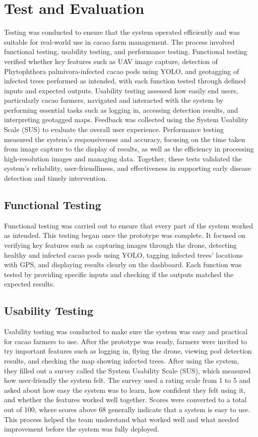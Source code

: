 \section{Test and Evaluation}

Testing was conducted to ensure that the system operated efficiently and was suitable for real-world use in cacao farm management. The process involved functional testing, usability testing, and performance testing. Functional testing verified whether key features such as UAV image capture, detection of Phytophthora palmivora-infected cacao pods using YOLO, and geotagging of infected trees performed as intended, with each function tested through defined inputs and expected outputs. Usability testing assessed how easily end users, particularly cacao farmers, navigated and interacted with the system by performing essential tasks such as logging in, accessing detection results, and interpreting geotagged maps. Feedback was collected using the System Usability Scale (SUS) to evaluate the overall user experience. Performance testing measured the system’s responsiveness and accuracy, focusing on the time taken from image capture to the display of results, as well as the efficiency in processing high-resolution images and managing data. Together, these tests validated the system’s reliability, user-friendliness, and effectiveness in supporting early disease detection and timely intervention.

\subsection{Functional Testing}

Functional testing was carried out to ensure that every part of the system worked as intended. This testing began once the prototype was complete. It focused on verifying key features such as capturing images through the drone, detecting healthy and infected cacao pods using YOLO, tagging infected trees’ locations with GPS, and displaying results clearly on the dashboard. Each function was tested by providing specific inputs and checking if the outputs matched the expected results.

\subsection{Usability Testing}

Usability testing was conducted to make sure the system was easy and practical for cacao farmers to use. After the prototype was ready, farmers were invited to try important features such as logging in, flying the drone, viewing pod detection results, and checking the map showing infected trees. After using the system, they filled out a survey called the System Usability Scale (SUS), which measured how user-friendly the system felt. The survey used a rating scale from 1 to 5 and asked about how easy the system was to learn, how confident they felt using it, and whether the features worked well together. Scores were converted to a total out of 100, where scores above 68 generally indicate that a system is easy to use. This process helped the team understand what worked well and what needed improvement before the system was fully deployed.

